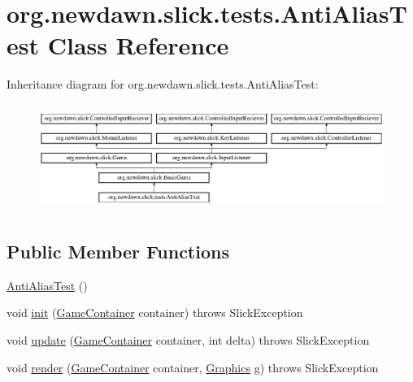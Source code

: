 \hypertarget{classorg_1_1newdawn_1_1slick_1_1tests_1_1_anti_alias_test}{}\section{org.\+newdawn.\+slick.\+tests.\+Anti\+Alias\+Test Class Reference}
\label{classorg_1_1newdawn_1_1slick_1_1tests_1_1_anti_alias_test}
Inheritance diagram for org.\+newdawn.\+slick.\+tests.\+Anti\+Alias\+Test\+:\begin{figure}[H]
\begin{center}
\leavevmode
\includegraphics[height=3.522012cm]{classorg_1_1newdawn_1_1slick_1_1tests_1_1_anti_alias_test}
\end{center}
\end{figure}
\subsection*{Public Member Functions}
\begin{DoxyCompactItemize}
\item 
\mbox{\hyperlink{classorg_1_1newdawn_1_1slick_1_1tests_1_1_anti_alias_test_a78c785d212d06cdc009b83a401545534}{Anti\+Alias\+Test}} ()
\item 
void \mbox{\hyperlink{classorg_1_1newdawn_1_1slick_1_1tests_1_1_anti_alias_test_a1c6a933bba1b9045e6cc0aa1e2d6ae1e}{init}} (\mbox{\hyperlink{classorg_1_1newdawn_1_1slick_1_1_game_container}{Game\+Container}} container)  throws Slick\+Exception 
\item 
void \mbox{\hyperlink{classorg_1_1newdawn_1_1slick_1_1tests_1_1_anti_alias_test_a045a75309e914fa8040339578abb1af1}{update}} (\mbox{\hyperlink{classorg_1_1newdawn_1_1slick_1_1_game_container}{Game\+Container}} container, int delta)  throws Slick\+Exception 
\item 
void \mbox{\hyperlink{classorg_1_1newdawn_1_1slick_1_1tests_1_1_anti_alias_test_a4700b49db72f7e2c111f0e7bb1af77e9}{render}} (\mbox{\hyperlink{classorg_1_1newdawn_1_1slick_1_1_game_container}{Game\+Container}} container, \mbox{\hyperlink{classorg_1_1newdawn_1_1slick_1_1_graphics}{Graphics}} g)  throws Slick\+Exception 
\end{DoxyCompactItemize}

